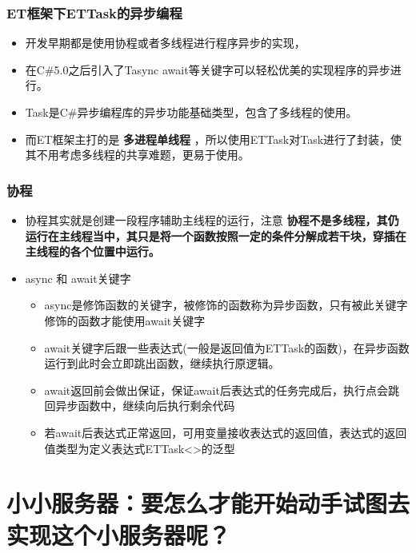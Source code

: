 \documentclass[9pt, b5paper]{article}
\begin{document}
\subsubsection{ET框架下ETTask的异步编程}
\label{sec-1-2-2}
\begin{itemize}
\item 开发早期都是使用协程或者多线程进行程序异步的实现，
\item 在C\#5.0之后引入了Tasync await等关键字可以轻松优美的实现程序的异步进行。
\item Task是C\#异步编程库的异步功能基础类型，包含了多线程的使用。
\item 而ET框架主打的是 \textbf{多进程单线程} ，所以使用ETTask对Task进行了封装，使其不用考虑多线程的共享难题，更易于使用。
\end{itemize}
\subsubsection{协程}
\label{sec-1-2-3}
\begin{itemize}
\item 协程其实就是创建一段程序辅助主线程的运行，注意 \textbf{协程不是多线程，其仍运行在主线程当中，其只是将一个函数按照一定的条件分解成若干块，穿插在主线程的各个位置中运行。}
\item async 和 await关键字
\begin{itemize}
\item async是修饰函数的关键字，被修饰的函数称为异步函数，只有被此关键字修饰的函数才能使用await关键字
\item await关键字后跟一些表达式(一般是返回值为ETTask的函数)，在异步函数运行到此时会立即跳出函数，继续执行原逻辑。
\item await返回前会做出保证，保证await后表达式的任务完成后，执行点会跳回异步函数中，继续向后执行剩余代码
\item 若await后表达式正常返回，可用变量接收表达式的返回值，表达式的返回值类型为定义表达式ETTask<>的泛型
\end{itemize}
\end{itemize}

\section{小小服务器：要怎么才能开始动手试图去实现这个小服务器呢？}
\label{sec-2}
\end{document}
